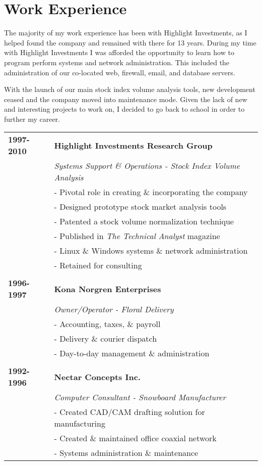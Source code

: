 \clearpage
\section{Work Experience}
The majority of my work experience has been with Highlight Investments, as I helped found the company and remained with there for 13 years. During my time with Highlight Investments I was afforded the opportunity to learn how to program perform systems and network administration. This included the administration of our co-located web, firewall, email, and database servers.

With the launch of our main stock index volume analysis tools, new development ceased and the company moved into maintenance mode. Given the lack of new and interesting projects to work on, I decided to go back to school in order to further my career. \\

\noindent
\begin{tabular}{l l}
\textbf{1997-2010} & \textbf{Highlight Investments Research Group} \\
& \emph{Systems Support \& Operations - Stock Index Volume Analysis} \\
& - Pivotal role in creating \& incorporating the company \\
& - Designed prototype stock market analysis tools \\
& - Patented a stock volume normalization technique \\
& - Published in \emph{The Technical Analyst} magazine \\
& - Linux \& Windows systems \& network administration \\
& - Retained for consulting \\
& \\
\textbf{1996-1997} & \textbf{Kona Norgren Enterprises} \\
& \emph{Owner/Operator - Floral Delivery} \\
& - Accounting, taxes, \& payroll \\
& - Delivery \& courier dispatch \\
& - Day-to-day management \& administration \\
& \\
\textbf{1992-1996} & \textbf{Nectar Concepts Inc.} \\
& \emph{Computer Consultant - Snowboard Manufacturer} \\
& - Created CAD/CAM drafting solution for manufacturing \\
& - Created \& maintained office coaxial network \\
& - Systems administration \& maintenance \\
\end{tabular}

